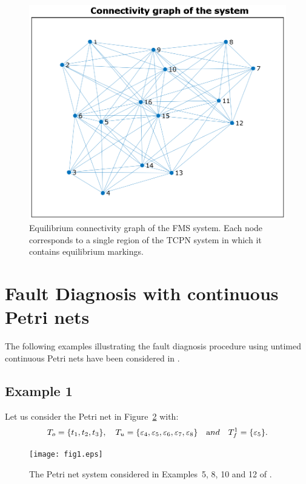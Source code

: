 \begin{figure}
    \centering
    \includegraphics{figs/E_graph.eps}
    \caption{Equilibrium connectivity graph of the FMS system. Each node corresponds to a single region of the TCPN system in which it contains equilibrium markings.}
    \label{fig:my_label}
\end{figure}

\section{Fault Diagnosis with continuous Petri nets}
\label{sec:fdsexamps}

The following examples illustrating the fault diagnosis procedure using untimed continuous Petri nets have been considered in \cite{ARMASECASI12}. 

\subsection{Example 1}
Let us consider the Petri net in Figure~\ref{f-es1} with:
$$T_o=\{t_1, t_2, t_3 \}, \quad T_u=\{ \varepsilon_4, \varepsilon_5, \varepsilon_6, \varepsilon_7,
\varepsilon_8 \} \quad {\text and} \quad T_f^1=\{ \varepsilon_5\}.$$

\begin{figure}[]
\begin{center}
\texttt{[image: fig1.eps]}
\caption[]{The Petri net system considered in Examples~5, 8, 10 and
12 of \cite{ARMASECASI12}.}
   \label{f-es1}
\end{center}
\end{figure}

